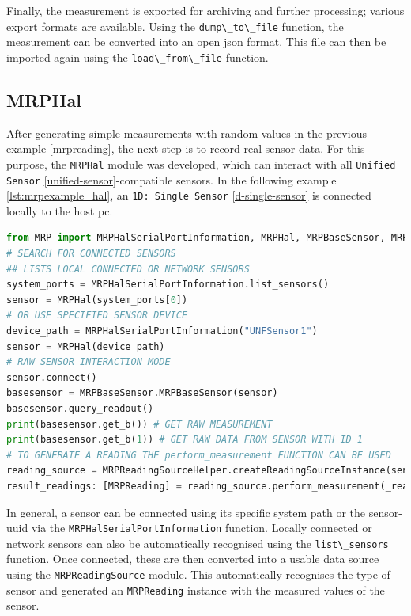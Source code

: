 Finally, the measurement is exported for archiving and further
processing; various export formats are available. Using the
\passthrough{\lstinline!dump\_to\_file!} function, the measurement can
be converted into an open \gls{json} format. This file can then be
imported again using the \passthrough{\lstinline!load\_from\_file!}
function.

\hypertarget{mrphal}{%
\subsection{MRPHal}\label{mrphal}}

After generating simple measurements with random values in the previous
example \ref{mrpreading}, the next step is to record real sensor data.
For this purpose, the \passthrough{\lstinline!MRPHal!} module was
developed, which can interact with all
\passthrough{\lstinline!Unified Sensor!} \ref{unified-sensor}-compatible
sensors. In the following example \ref{lst:mrpexample_hal}, an
\passthrough{\lstinline!1D: Single Sensor!} \ref{d-single-sensor} is
connected locally to the host \gls{pc}.

\begin{lstlisting}[language=Python, caption={MRPHal example to use an connected hardware sensor to store readings inside of a measurement}, label=lst:mrpexample_hal]
from MRP import MRPHalSerialPortInformation, MRPHal, MRPBaseSensor, MRPReadingSource
# SEARCH FOR CONNECTED SENSORS
## LISTS LOCAL CONNECTED OR NETWORK SENSORS
system_ports = MRPHalSerialPortInformation.list_sensors()
sensor = MRPHal(system_ports[0])
# OR USE SPECIFIED SENSOR DEVICE
device_path = MRPHalSerialPortInformation("UNFSensor1")
sensor = MRPHal(device_path)
# RAW SENSOR INTERACTION MODE
sensor.connect()
basesensor = MRPBaseSensor.MRPBaseSensor(sensor)
basesensor.query_readout()
print(basesensor.get_b()) # GET RAW MEASUREMENT
print(basesensor.get_b(1)) # GET RAW DATA FROM SENSOR WITH ID 1
# TO GENERATE A READING THE perform_measurement FUNCTION CAN BE USED
reading_source = MRPReadingSourceHelper.createReadingSourceInstance(sensor)
result_readings: [MRPReading] = reading_source.perform_measurement(_readings=1, _hwavg=1)
\end{lstlisting}

In general, a sensor can be connected using its specific system path or
the sensor-\gls{uuid} via the
\passthrough{\lstinline!MRPHalSerialPortInformation!} function. Locally
connected or network sensors can also be automatically recognised using
the \passthrough{\lstinline!list\_sensors!} function. Once connected,
these are then converted into a usable data source using the
\passthrough{\lstinline!MRPReadingSource!} module. This automatically
recognises the type of sensor and generated an
\passthrough{\lstinline!MRPReading!} instance with the measured values
of the sensor.

